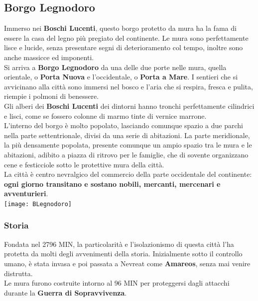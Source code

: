 \documentclass[10pt,twoside,onecolumn,openany]{book}
\begin{document}
\subsection{Borgo Legnodoro}
Immerso nei \textbf{Boschi Lucenti}, questo borgo protetto da mura ha la fama di essere la casa del legno più pregiato del continente. Le mura sono perfettamente lisce e lucide, senza presentare segni di deterioramento col tempo, inoltre sono anche massicce ed imponenti.\\
Si arriva a \textbf{Borgo Legnodoro} da una delle due porte nelle mura, quella orientale, o \textbf{Porta Nuova} e l'occidentale, o \textbf{Porta a Mare}. I sentieri che si avvicinano alla città sono immersi nel bosco e l'aria che si respira, fresca e pulita, riempie i polmoni di benessere.\\
Gli alberi dei \textbf{Boschi Lucenti} dei dintorni hanno tronchi perfettamente cilindrici e lisci, come se fossero colonne di marmo tinte di vernice marrone.\\
L'interno del borgo è molto popolato, lasciando comunque spazio a due parchi nella parte settentrionale, divisi da una serie di abitazioni. La parte meridionale, la più densamente popolata, presente comunque un ampio spazio tra le mura e le abitazioni, adibito a piazza di ritrovo per le famiglie, che di sovente organizzano cene e festicciole sotto le protettive mura della città.\\
La città è centro nevralgico del commercio della parte occidentale del continente: \textbf{ogni giorno transitano e sostano nobili, mercanti, mercenari e avventurieri}.
\\
\texttt{[image: BLegnodoro]}\\
\subsubsection{Storia}
Fondata nel 2796 MIN, la particolarità e l'isolazionismo di questa città l'ha protetta da molti degli avvenimenti della storia. Inizialmente sotto il controllo umano, è stata invasa e poi passata a Nevreat come \textbf{Amareos}, senza mai venire distrutta.\\
Le mura furono costruite intorno al 96 MIN per proteggersi dagli attacchi durante la \textbf{Guerra di Sopravvivenza}.
\newpage
\end{document}
